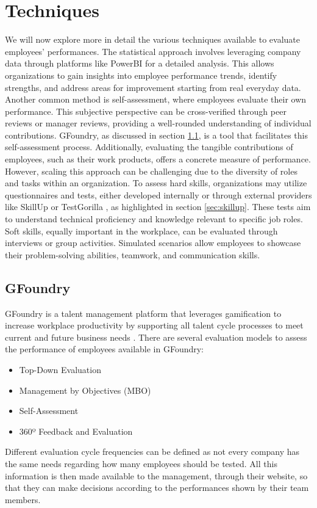 \section{Techniques}

We will now explore more in detail the various techniques available to evaluate employees' performances. The statistical approach involves leveraging company data through platforms like PowerBI \cite{powerBI} for a detailed analysis. This allows organizations to gain insights into employee performance trends, identify strengths, and address areas for improvement starting from real everyday data. Another common method is self-assessment, where employees evaluate their own performance. This subjective perspective can be cross-verified through peer reviews or manager reviews, providing a well-rounded understanding of individual contributions. GFoundry, as discussed in section \ref{sec:gfoundry}, is a tool that facilitates this self-assessment process. Additionally, evaluating the tangible contributions of employees, such as their work products, offers a concrete measure of performance. However, scaling this approach can be challenging due to the diversity of roles and tasks within an organization. To assess hard skills, organizations may utilize questionnaires and tests, either developed internally or through external providers like SkillUp \cite{skillup} or TestGorilla \cite{testgorilla}, as highlighted in section \ref{sec:skillup}. These tests aim to understand technical proficiency and knowledge relevant to specific job roles. Soft skills, equally important in the workplace, can be evaluated through interviews or group activities. Simulated scenarios allow employees to showcase their problem-solving abilities, teamwork, and communication skills.

\subsection{GFoundry}
\label{sec:gfoundry}

GFoundry is a talent management platform that leverages gamification to increase workplace productivity by supporting all talent cycle processes to meet current and future business needs \cite{gfoundry}. There are several evaluation models to assess the performance of employees available in GFoundry:
\begin{itemize}
      \item Top-Down Evaluation
      \item Management by Objectives (MBO)
      \item Self-Assessment
      \item 360º Feedback and Evaluation
\end{itemize}
Different evaluation cycle frequencies can be defined as not every company has the same needs regarding how many employees should be tested. All this information is then made available to the management, through their website, so that they can make decisions according to the performances shown by their team members.

